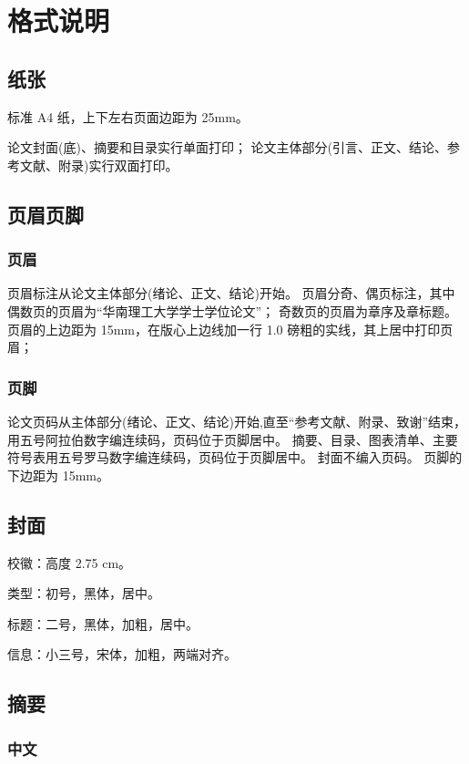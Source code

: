 \chapter{格式说明}

\section{纸张}

标准 A4 纸，上下左右页面边距为 25mm。

论文封面(底)、摘要和目录实行单面打印；
论文主体部分(引言、正文、结论、参考文献、附录)实行双面打印。

\section{页眉页脚}

\subsection{页眉}

页眉标注从论文主体部分(绪论、正文、结论)开始。
页眉分奇、偶页标注，其中偶数页的页眉为“华南理工大学学士学位论文”；
奇数页的页眉为章序及章标题。
页眉的上边距为 15mm，在版心上边线加一行 1.0 磅粗的实线，其上居中打印页眉；

\subsection{页脚}

论文页码从主体部分(绪论、正文、结论)开始,直至“参考文献、附录、致谢”结束，用五号阿拉伯数字编连续码，页码位于页脚居中。
摘要、目录、图表清单、主要符号表用五号罗马数字编连续码，页码位于页脚居中。
封面不编入页码。
页脚的下边距为 15mm。

\section{封面}

校徽：高度 2.75 cm。

类型：初号，黑体，居中。

标题：二号，黑体，加粗，居中。

信息：小三号，宋体，加粗，两端对齐。


\section{摘要}

\subsection{中文}

